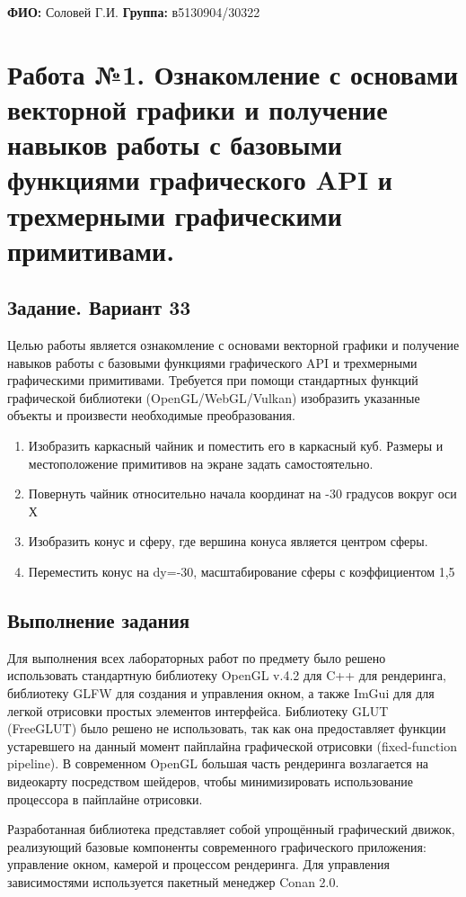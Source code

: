 \documentclass[a4paper,12pt]{article}
\begin{document}
\noindent \textbf{ФИО:} Соловей Г.И. \hfill \textbf{Группа:} в5130904/30322

\section*{Работа №1. Ознакомление с основами векторной графики и получение
  навыков работы с базовыми функциями графического API и
  трехмерными графическими примитивами.}
\subsection* {Задание. Вариант 33}
Целью работы является ознакомление с основами векторной графики и получение
навыков работы с базовыми функциями графического API и трехмерными
графическими примитивами.
Требуется при помощи стандартных функций графической библиотеки
(OpenGL/WebGL/Vulkan) изобразить указанные объекты и произвести необходимые
преобразования.
\begin{enumerate}
    \item Изобразить каркасный чайник и поместить его в каркасный куб. Размеры и
          местоположение примитивов на экране задать самостоятельно.
    \item Повернуть чайник относительно начала координат на -30 градусов вокруг оси Х
    \item Изобразить конус и сферу, где вершина конуса является центром сферы.
    \item Переместить конус на dy=-30, масштабирование сферы с коэффициентом 1,5
\end{enumerate}
\newpage
\subsection* {Выполнение задания}
Для выполнения всех лабораторных работ по предмету было решено использовать стандартную библиотеку OpenGL v.4.2 для C++ для рендеринга,
библиотеку GLFW для создания и управления окном, а также ImGui для для легкой отрисовки простых элементов интерфейса.
Библиотеку GLUT (FreeGLUT) было решено не использовать, так как она предоставляет функции устаревшего на данный
момент пайплайна графической отрисовки (fixed-function pipeline). В современном OpenGL большая часть рендеринга
возлагается на видеокарту посредством шейдеров, чтобы минимизировать использование процессора в пайплайне отрисовки.

Разработанная библиотека представляет собой упрощённый графический движок,
реализующий базовые компоненты современного графического приложения: управление окном,
камерой и процессом рендеринга.
Для управления зависимостями используется пакетный менеджер Conan 2.0.
\end{document}
